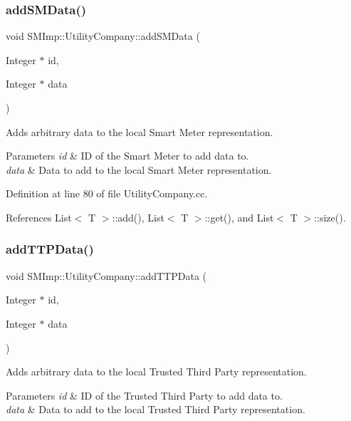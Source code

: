 \subsubsection{\texorpdfstring{add\+S\+M\+Data()}{addSMData()}}
{\footnotesize\ttfamily void S\+M\+Imp\+::\+Utility\+Company\+::add\+S\+M\+Data (\begin{DoxyParamCaption}\item[{Integer $\ast$}]{id,  }\item[{Integer $\ast$}]{data }\end{DoxyParamCaption})}

Adds arbitrary data to the local Smart Meter representation. 
\begin{DoxyParams}{Parameters}
{\em id} & ID of the Smart Meter to add data to. \\
\hline
{\em data} & Data to add to the local Smart Meter representation. \\
\hline
\end{DoxyParams}


Definition at line 80 of file Utility\+Company.\+cc.



References List$<$ T $>$\+::add(), List$<$ T $>$\+::get(), and List$<$ T $>$\+::size().

\mbox{\label{classSMImp_1_1UtilityCompany_a03e5d17d5403d9f7527b81d82156650c}} 
\subsubsection{\texorpdfstring{add\+T\+T\+P\+Data()}{addTTPData()}}
{\footnotesize\ttfamily void S\+M\+Imp\+::\+Utility\+Company\+::add\+T\+T\+P\+Data (\begin{DoxyParamCaption}\item[{Integer $\ast$}]{id,  }\item[{Integer $\ast$}]{data }\end{DoxyParamCaption})}

Adds arbitrary data to the local Trusted Third Party representation. 
\begin{DoxyParams}{Parameters}
{\em id} & ID of the Trusted Third Party to add data to. \\
\hline
{\em data} & Data to add to the local Trusted Third Party representation. \\
\hline
\end{DoxyParams}


